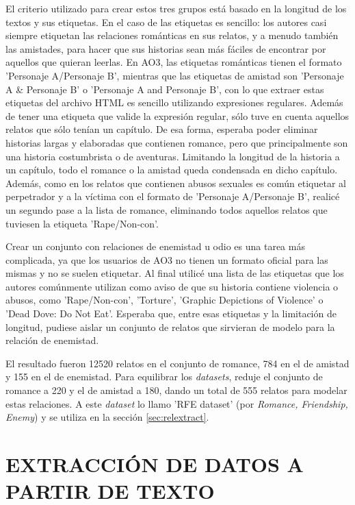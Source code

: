 \documentclass{pre-tfg}
\begin{document}
El criterio utilizado para crear estos tres grupos está basado en la longitud de los textos y sus etiquetas. En el caso de las etiquetas es sencillo: los autores casi siempre etiquetan las relaciones románticas en sus relatos, y a menudo también las amistades, para hacer que sus historias sean más fáciles de encontrar por aquellos que quieran leerlas. En AO3, las etiquetas románticas tienen el formato 'Personaje A/Personaje B', mientras que las etiquetas de amistad son 'Personaje A \& Personaje B' o 'Personaje A and  Personaje B', con lo que extraer estas etiquetas del archivo HTML es sencillo utilizando expresiones regulares. Además de tener una etiqueta que valide la expresión regular, sólo tuve en cuenta aquellos relatos que sólo tenían un capítulo. De esa forma, esperaba poder eliminar historias largas y elaboradas que contienen romance, pero que principalmente son una historia costumbrista o de aventuras. Limitando la longitud de la historia a un capítulo, todo el romance o la amistad queda condensada en dicho capítulo. Además, como en los relatos que contienen abusos sexuales es común etiquetar al perpetrador y a la víctima con el formato de 'Personaje A/Personaje B', realicé un segundo pase a la lista de romance, eliminando todos aquellos relatos que tuviesen la etiqueta 'Rape/Non-con'.

Crear un conjunto con relaciones de enemistad u odio es una tarea más complicada, ya que los usuarios de AO3 no tienen un formato oficial para las mismas y no se suelen etiquetar. Al final utilicé una lista de las etiquetas que los autores comúnmente utilizan como aviso de que su historia contiene violencia o abusos, como 'Rape/Non-con', 'Torture', 'Graphic Depictions of Violence' o 'Dead Dove: Do Not Eat'. Esperaba que, entre esas etiquetas y la limitación de longitud, pudiese aislar un conjunto de relatos que sirvieran de modelo para la relación de enemistad.

El resultado fueron 12520 relatos en el conjunto de romance, 784 en el de amistad y 155 en el de enemistad. Para equilibrar los \textit{datasets}, reduje el conjunto de romance a 220 y el de amistad a 180, dando un total de 555 relatos para modelar estas relaciones. A este \textit{dataset} lo llamo 'RFE dataset' (por \textit{Romance, Friendship, Enemy}) y se utiliza en la sección \ref{sec:relextract}.

\cleardoublepage
\section {EXTRACCIÓN DE DATOS A PARTIR DE TEXTO}
\end{document}
